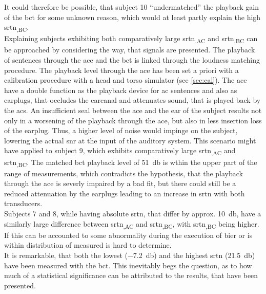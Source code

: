 It could therefore be possible, that subject 10 \enquote{undermatched} the playback gain of the \gls{bct} for some unknown reason, which would at least partly explain the high \gls{srtn}\textsubscript{,BC}.\\
Explaining subjects exhibiting both comparatively large \gls{srtn}\textsubscript{,AC} and \gls{srtn}\textsubscript{,BC} can be approached by considering the way, that signals are presented.
The playback of sentences through the \gls{ace} and the \gls{bct} is linked through the loudness matching procedure. The playback level through the \gls{ace} has been set a priori with a calibration procedure with a head and torso simulator (see \autoref{sec:cal}). The \gls{ace} have a double function as the playback device for \gls{ac} sentences and also as earplugs, that occludes the earcanal and attenuates sound, that is played back by the \gls{acs}.
An insufficient seal between the \gls{ace} and the ear of the subject results not only in a worsening of the playback through the \gls{ace}, but also in less insertion loss of the earplug. Thus, a higher level of noise would impinge on the subject, lowering the actual \gls{snr} at the input of the auditory system.
This scenario might have applied to subject 9, which exhibits comparatively large \gls{srtn}\textsubscript{,AC} and \gls{srtn}\textsubscript{,BC}. 
The matched \gls{bct} playback level of \SI{51}{\decibel} is wthin the upper part of the range of measurements, which contradicts the hypothesis, that the playback through the \gls{ace} is severly impaired by a bad fit, but there could still be a reduced attenuation by the earplugs leading to an increase in \gls{srtn} with both transducers.\\
Subjects 7 and 8, while having absolute \gls{srtn}, that differ by approx. \SI{10}{\decibel}, have a similarly large difference between \gls{srtn}\textsubscript{,AC} and \gls{srtn}\textsubscript{,BC}, with \gls{srtn}\textsubscript{,BC} being higher.
If this can be accounted to some abnormality during the execution of \gls{bier} or is within distribution of measured is hard to determine.\\
It is remarkable, that both the lowest (\SI{-7.2}{\decibel}) and the highest \gls{srtn} (\SI{21.5}{\decibel}) have been measured with the \gls{bct}.
This inevitably begs the question, as to how much of a statistical significance can be attributed to the results, that have been presented.\\

